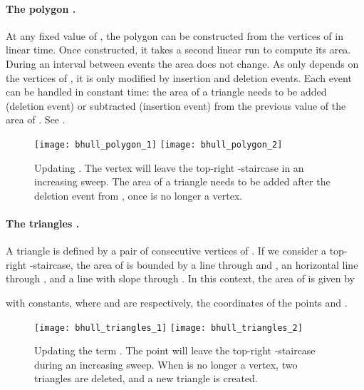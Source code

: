 \documentclass[11pt,letterpaper,english]{article}
\theoremstyle{definition}
\begin{document}
\paragraph{The polygon .}

At any fixed value of , the polygon can be constructed from the
vertices of  in linear time. Once constructed, it takes a
second linear run to compute its area. During an interval between
events the area does not change. As  only depends on the
vertices of , it is only modified by insertion and deletion
events. Each event can be handled in constant time: the area of a
triangle needs to be added (deletion event) or subtracted (insertion
event) from the previous value of the area of . See
.

\begin{figure}[ht]
  \centering
  \subcaptionbox{\label{apps:area:fig:polygon:1}}
  {\texttt{[image: bhull\_polygon\_1]}}
  \hspace{1.5cm}
  \subcaptionbox{\label{apps:area:fig:polygon:2}}
  {\texttt{[image: bhull\_polygon\_2]}}
  \caption{Updating
    .  The vertex 
    will leave the top-right -staircase in an increasing sweep.
     The area of a triangle needs to
    be added after the deletion event from , once  is no longer a
    vertex.}
  \label{apps:area:fig:polygon}
\end{figure}

\paragraph{The triangles .}

A triangle is defined by a pair of consecutive vertices of . If we
consider a top-right -staircase, the area of  is
bounded by a line through  and , an horizontal line
through , and a line with slope  through
. In this context, the area of  is given by


with  constants, where  and 
are respectively, the coordinates of the points  and .

\begin{figure}[ht]
  \centering
  \subcaptionbox{\label{apps:area:fig:triangle:1}}
  {\texttt{[image: bhull\_triangles\_1]}}
  \hspace{1cm}
  \subcaptionbox{\label{apps:area:fig:triangle:2}}
  {\texttt{[image: bhull\_triangles\_2]}}
  \caption{Updating the term .
     The point  will leave the
    top-right -staircase during an increasing
    sweep.  When  is no longer a
    vertex, two triangles are deleted, and a new triangle is created.}
  \label{apps:area:fig:triangle}
\end{figure}
\end{document}
